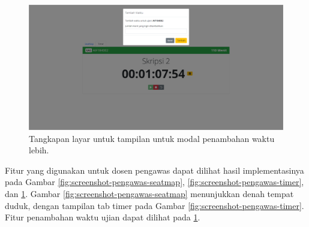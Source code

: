     \begin{figure}
        \centering
        \includegraphics[width=0.7\paperwidth]{Gambar/implemented-interface/pengawas/overtime.png}
        \caption{Tangkapan layar untuk tampilan untuk modal penambahan waktu lebih.}
        \label{fig:screenshot-pengawas-overtime}
    \end{figure}
    Fitur yang digunakan untuk dosen pengawas dapat dilihat hasil implementasinya pada
    Gambar \ref{fig:screenshot-pengawas-seatmap}, \ref{fig:screenshot-pengawas-timer}, dan
    \ref{fig:screenshot-pengawas-overtime}. Gambar \ref{fig:screenshot-pengawas-seatmap} menunjukkan denah
    tempat duduk, dengan tampilan tab timer pada Gambar \ref{fig:screenshot-pengawas-timer}. Fitur penambahan
    waktu ujian dapat dilihat pada \ref{fig:screenshot-pengawas-overtime}.
    
    
